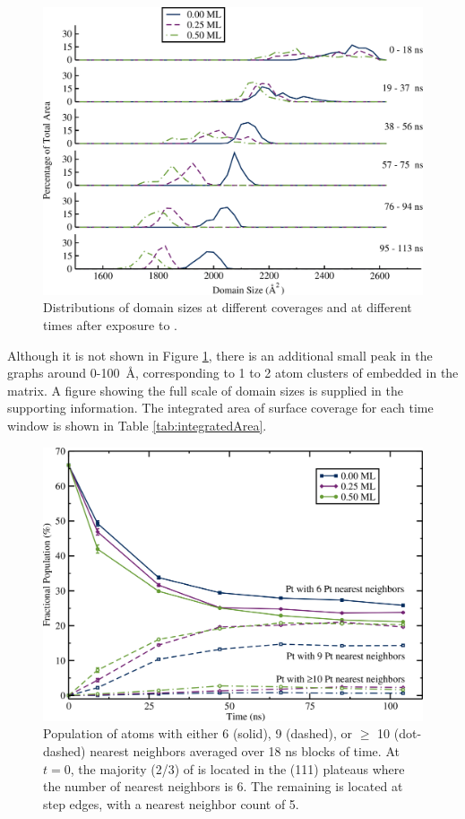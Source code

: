 \begin{figure}[p!]
\includegraphics[width=\linewidth]{../figures/chap3/domains_Pt_110ns.pdf}
\caption{Distributions of  domain sizes at different 
  coverages and at different times after exposure to .}
\label{fig:domainAreasPt}
\end{figure}

Although it is not shown in Figure \ref{fig:domainAreasPt}, there is
an additional small peak in the  graphs around 0-100~\AA,
corresponding to 1 to 2 atom clusters of  embedded in the
 matrix.  A figure showing the full scale of domain sizes is
supplied in the supporting information.  The integrated area of
surface coverage for each time window is shown in Table
\ref{tab:integratedArea}.

\begin{figure}[p!]
  \includegraphics[width=\linewidth]{../figures/chap3/nn.pdf}
  \caption{Population of  atoms with either 6 (solid), 9
    (dashed), or $\ge$ 10 (dot-dashed)  nearest neighbors
    averaged over 18 ns blocks of time.  At $t=0$, the majority
    (2/3) of  is located in the (111) plateaus where
    the number of  nearest neighbors is 6. The remaining
     is located at step edges, with a nearest neighbor 
    count of 5.} \label{fig:nearestNeighbors}
\end{figure}

